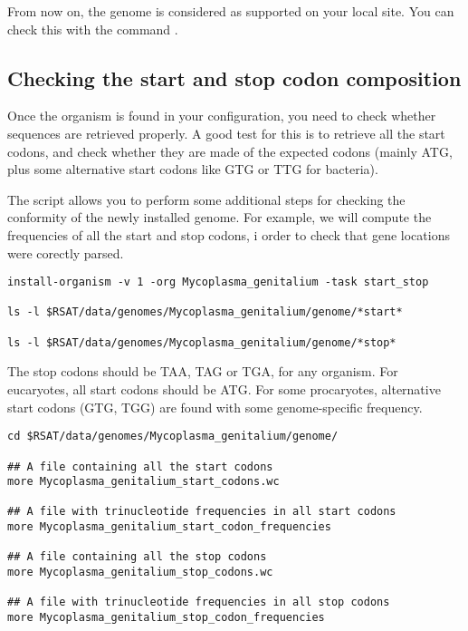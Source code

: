 From now on, the genome is considered as supported on your local \RSAT
site. You can check this with the command . 

\subsection{Checking the start and stop codon composition}

Once the organism is found in your configuration, you need to check
whether sequences are retrieved properly. A good test for this is to
retrieve all the start codons, and check whether they are made of the
expected codons (mainly ATG, plus some alternative start codons like
GTG or TTG for bacteria).

The script  allows you to perform some
additional steps for checking the conformity of the newly installed
genome. For example, we will compute the frequencies of all the start
and stop codons, i order to check that gene locations were corectly
parsed.

\begin{footnotesize}
\begin{verbatim}
install-organism -v 1 -org Mycoplasma_genitalium -task start_stop

ls -l $RSAT/data/genomes/Mycoplasma_genitalium/genome/*start*

ls -l $RSAT/data/genomes/Mycoplasma_genitalium/genome/*stop*
\end{verbatim}
\end{footnotesize}


The stop codons should be TAA, TAG or TGA, for any organism. For
eucaryotes, all start codons should be ATG. For some procaryotes,
alternative start codons (GTG, TGG) are found with some
genome-specific frequency.

\begin{footnotesize}
\begin{verbatim}
cd $RSAT/data/genomes/Mycoplasma_genitalium/genome/

## A file containing all the start codons
more Mycoplasma_genitalium_start_codons.wc

## A file with trinucleotide frequencies in all start codons
more Mycoplasma_genitalium_start_codon_frequencies

## A file containing all the stop codons
more Mycoplasma_genitalium_stop_codons.wc

## A file with trinucleotide frequencies in all stop codons
more Mycoplasma_genitalium_stop_codon_frequencies
\end{verbatim}
\end{footnotesize}

